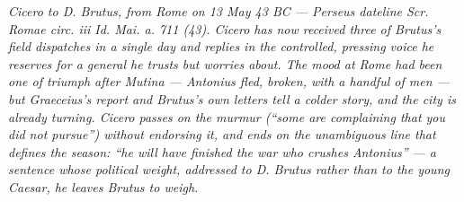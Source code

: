
\textit{Cicero to D. Brutus, from Rome on 13 May 43 BC ---
Perseus dateline \textit{Scr. Romae circ. iii Id. Mai. a. 711 (43)}.
Cicero has now received three of Brutus's field dispatches in a single day
and replies in the controlled, pressing voice he reserves for a general
he trusts but worries about. The mood at Rome had been one of triumph after
Mutina --- Antonius fled, broken, with a handful of men --- but Graeceius's
report and Brutus's own letters tell a colder story, and the city is already
turning. Cicero passes on the murmur (``some are complaining that you did
not pursue'') without endorsing it, and ends on the unambiguous line
that defines the season: ``he will have finished the war who crushes
Antonius'' --- a sentence whose political weight, addressed to D. Brutus
rather than to the young Caesar, he leaves Brutus to weigh.}
